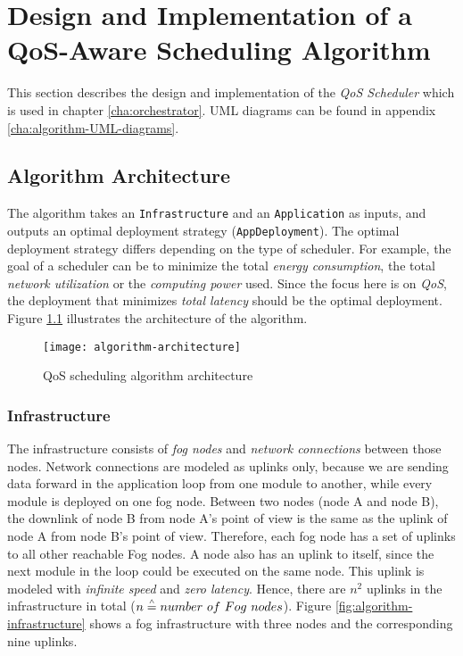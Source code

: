 \chapter{Design and Implementation of a QoS-Aware Scheduling Algorithm\label{cha:algorithm}}

This section describes the design and implementation of the \textit{QoS Scheduler} which is used in chapter \ref{cha:orchestrator}. UML diagrams can be found in appendix \ref{cha:algorithm-UML-diagrams}.

\section{Algorithm Architecture}

The algorithm takes an \texttt{Infrastructure} and an \texttt{Application} as inputs, and outputs an optimal deployment strategy (\texttt{AppDeployment}).
The optimal deployment strategy differs depending on the type of scheduler.
For example, the goal of a scheduler can be to minimize the total \textit{energy consumption}, the total \textit{network utilization} or the \textit{computing power} used.
Since the focus here is on \textit{QoS}, the deployment that minimizes \textit{total latency} should be the optimal deployment.
Figure \ref{fig:algorithm-architecture} illustrates the architecture of the algorithm.

\begin{figure}[h]
    \centering
    \texttt{[image: algorithm-architecture]}
    \caption{QoS scheduling algorithm architecture}
    \label{fig:algorithm-architecture}
\end{figure}


\subsection{Infrastructure\label{sec:algorithm-infrastructure}}

The infrastructure consists of \textit{fog nodes} and \textit{network connections} between those nodes.
Network connections are modeled as uplinks only, because we are sending data forward in the application loop from one module to another, while every module is deployed on one fog node.
Between two nodes (node A and node B), the downlink of node B from node A's point of view is the same as the uplink of node A from node B's point of view.
Therefore, each fog node has a set of uplinks to all other reachable Fog nodes.
A node also has an uplink to itself, since the next module in the loop could be executed on the same node.
This uplink is modeled with \textit{infinite speed} and \textit{zero latency}.
Hence, there are \(n^2\) uplinks in the infrastructure in total ($n \overset{\scriptscriptstyle\wedge}{=} number\ of\ Fog\ nodes$).
Figure \ref{fig:algorithm-infrastructure} shows a fog infrastructure with three nodes and the corresponding nine uplinks.

